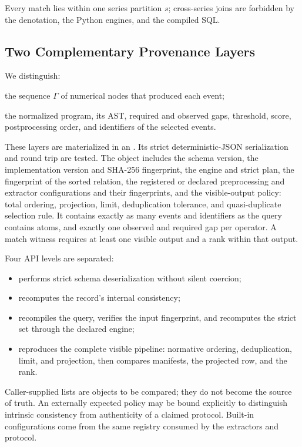 Every match lies within one series partition $s$; cross-series joins are forbidden by the denotation, the Python engines, and the compiled SQL.

\subsection{Two Complementary Provenance Layers}

We distinguish:
\begin{description}[style=nextline,leftmargin=1.2cm]
  \item[Extraction provenance] the sequence $\Gamma$ of numerical nodes that produced each event;
  \item[Query provenance] the normalized program, its AST, required and observed gaps, threshold, score, postprocessing order, and identifiers of the selected events.
\end{description}
These layers are materialized in an . Its strict deterministic-JSON serialization and round trip are tested. The object includes the schema version, the implementation version and SHA-256 fingerprint, the engine and strict plan, the fingerprint of the sorted relation, the registered or declared preprocessing and extractor configurations and their fingerprints, and the visible-output policy: total ordering, projection, limit, deduplication tolerance, and quasi-duplicate selection rule. It contains exactly as many events and identifiers as the query contains atoms, and exactly one observed and required gap per  operator. A match witness requires at least one visible output and a rank within that output.

Four API levels are separated:
\begin{itemize}
  \item {} performs strict schema deserialization without silent coercion;
  \item {} recomputes the record's internal consistency;
  \item {} recompiles the query, verifies the input fingerprint, and recomputes the strict set through the declared engine;
  \item {} reproduces the complete visible pipeline: normative ordering, deduplication, limit, and projection, then compares manifests, the projected row, and the rank.
\end{itemize}
Caller-supplied lists are objects to be compared; they do not become the source of truth. An externally expected policy may be bound explicitly to distinguish intrinsic consistency from authenticity of a claimed protocol. Built-in configurations come from the same  registry consumed by the extractors and protocol.

